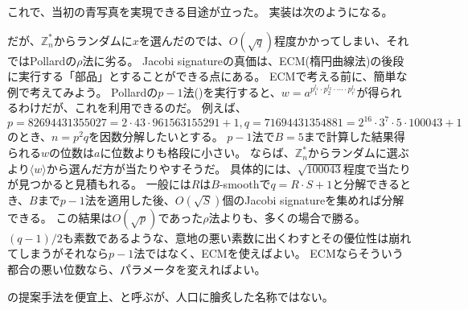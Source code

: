 これで、当初の青写真を実現できる目途が立った。
実装は次のようになる。


だが、$\mathbb{Z}_n^*$からランダムに$x$を選んだのでは、$O(\sqrt{q})$程度かかってしまい、それではPollardの$\rho$法に劣る。
Jacobi signatureの真価は、ECM(楕円曲線法)の後段に実行する「部品」とすることができる点にある。
ECMで考える前に、簡単な例で考えてみよう。
Pollardの$p-1$法()を実行すると、$w=a^{p_1^{l_1}\cdot p_2^{l_2}\cdot\cdots\cdot p_r^{l_r}}$が得られるわけだが、これを利用できるのだ。
例えば、$p=82694431355027=2\cdot43\cdot961563155291+1, q=71694431354881=2^{16}\cdot3^7\cdot5\cdot100043+1$のとき、$n=p^2q$を因数分解したいとする。
$p-1$法で$B=5$まで計算した結果得られる$w$の位数は$a$に位数よりも格段に小さい。
ならば、$\mathbb{Z}_n^*$からランダムに選ぶより$\langle w\rangle$から選んだ方が当たりやすそうだ。
具体的には、$\sqrt{100043}$程度で当たりが見つかると見積もれる。
一般には$R$は$B$-smoothで$q=R\cdot S+1$と分解できるとき、$B$まで$p-1$法を適用した後、$O(\sqrt{S})$個のJacobi signatureを集めれば分解できる。
この結果は$O(\sqrt{p})$であった$\rho$法よりも、多くの場合で勝る。
$(q-1)/2$も素数であるような、意地の悪い素数に出くわすとその優位性は崩れてしまうがそれなら$p-1$法ではなく、ECMを使えばよい。
ECMならそういう都合の悪い位数なら、パラメータを変えればよい。

\cite{PeraltaOkamoto1996}の提案手法を便宜上、と呼ぶが、人口に膾炙した名称ではない。


\cite{10.1007/978-3-0348-8295-8_11}


